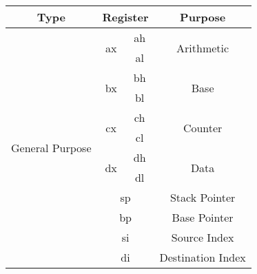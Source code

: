 \documentclass[11pt,a5paper,footinclude=true,headinclude=true]{scrbook} %
\begin{document}
\begin{center}
    \begin{tabular}{|c|c|c|c|}
        \hline
        Type & \multicolumn{2}{c|}{Register} & Purpose \\\hline\hline
        \multirow{16}{*}{General Purpose} & \multirow{2}{*}{ax} & ah & \multirow{2}{*}{Arithmetic} \\
                                        \cline{3-3}
                                        & & al & \\
                                        \cline{2-4}
                                        & \multirow{2}{*}{bx} & bh & \multirow{2}{*}{Base} \\
                                        \cline{3-3}
                                        & & bl & \\
                                        \cline{2-4}
                                        & \multirow{2}{*}{cx} & ch & \multirow{2}{*}{Counter} \\
                                        \cline{3-3}
                                        & & cl & \\
                                        \cline{2-4}
                                        & \multirow{2}{*}{dx} & dh & \multirow{2}{*}{Data} \\
                                        \cline{3-3}
                                        & & dl & \\
                                        \cline{2-4}
                                        & \multicolumn{2}{c|}{\multirow{2}{*}{sp}} & \multirow{2}{*}{Stack Pointer} \\
                                        & \multicolumn{2}{c|}{} & \\
                                        \cline{2-4}
                                        & \multicolumn{2}{c|}{\multirow{2}{*}{bp}} & \multirow{2}{*}{Base Pointer} \\
                                        & \multicolumn{2}{c|}{} & \\
                                        \cline{2-4}
                                        & \multicolumn{2}{c|}{\multirow{2}{*}{si}} & \multirow{2}{*}{Source Index} \\
                                        & \multicolumn{2}{c|}{} & \\
                                        \cline{2-4}
                                        & \multicolumn{2}{c|}{\multirow{2}{*}{di}} & \multirow{2}{*}{Destination Index} \\

\end{tabular}
\end{center}
\end{document}
